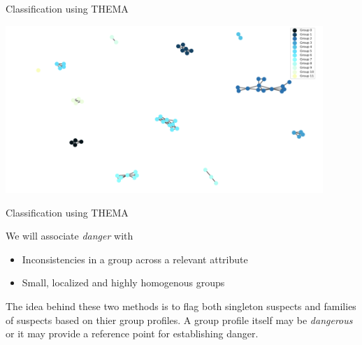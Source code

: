 \documentclass[aspectratio=169]{beamer}
\begin{document}
  \begin{frame}{Classification using THEMA}
    \begin{center}
      \includegraphics[width=0.9\textwidth]{images/model12.png}
    \end{center}
  \end{frame}

  \begin{frame}{Classification using THEMA}
        We will associate \textit{danger} with  
        \begin{itemize}
          \item Inconsistencies in a group across a relevant attribute   
          \item Small, localized and highly homogenous groups  
        \end{itemize}
        The idea behind these two methods is to flag both singleton suspects and families of suspects based 
        on thier group profiles. A group profile itself may be \textit{dangerous} or it 
        may provide a reference point for establishing danger.
        \end{frame}
\end{document}
